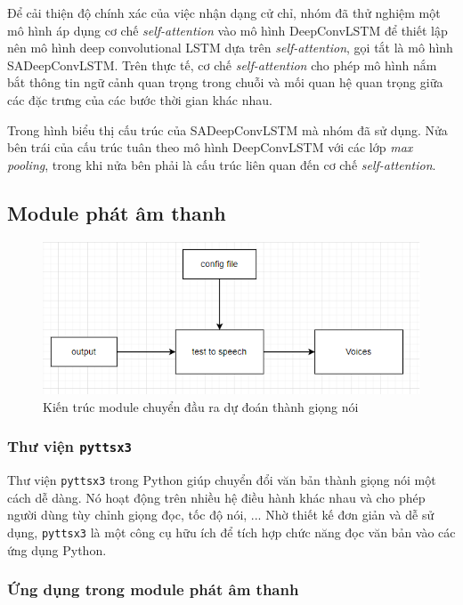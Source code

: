 Để cải thiện độ chính xác của việc nhận dạng cử chỉ, nhóm đã thử nghiệm một mô hình áp dụng cơ chế \textit{self-attention} vào mô hình DeepConvLSTM để thiết lập nên mô hình deep convolutional LSTM dựa trên \textit{self-attention}, gọi tắt là mô hình SADeepConvLSTM. Trên thực tế, cơ chế \textit{self-attention} cho phép mô hình nắm bắt thông tin ngữ cảnh quan trọng trong chuỗi và mối quan hệ quan trọng giữa các đặc trưng của các bước thời gian khác nhau.

Trong hình biểu thị cấu trúc của SADeepConvLSTM mà nhóm đã sử dụng. Nửa bên trái của cấu trúc tuân theo mô hình DeepConvLSTM với các lớp \textit{max pooling}, trong khi nửa bên phải là cấu trúc liên quan đến cơ chế \textit{self-attention}. 


\subsection{Module phát âm thanh}
\begin{figure}[H]
    \centering
    \includegraphics[width=\textwidth,height=\textheight,keepaspectratio]{Images/Theoretical basis/test2speech.png}
    \caption{Kiến trúc module chuyển đầu ra dự đoán thành giọng nói}
    \label{fig:enter-label}
\end{figure}


\subsubsection{Thư viện \texttt{pyttsx3}}

Thư viện \texttt{pyttsx3} trong Python giúp chuyển đổi văn bản thành giọng nói một cách dễ dàng. Nó hoạt động trên nhiều hệ điều hành khác nhau và cho phép người dùng tùy chỉnh giọng đọc, tốc độ nói, ...  Nhờ thiết kế đơn giản và dễ sử dụng, \texttt{pyttsx3} là một công cụ hữu ích để tích hợp chức năng đọc văn bản vào các ứng dụng Python.

\subsubsection{Ứng dụng trong module phát âm thanh}

